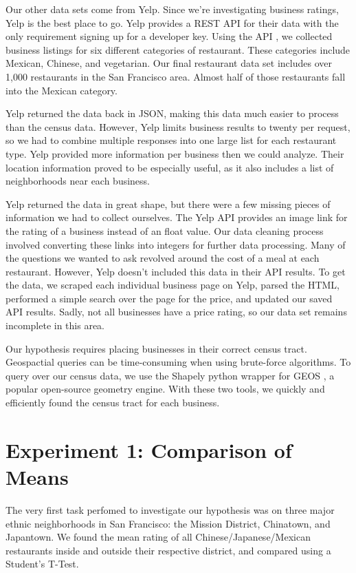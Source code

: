 \documentclass[11pt,twocolumn]{article}
\begin{document}
Our other data sets come from Yelp. Since we're investigating business ratings, Yelp is the best place to go. Yelp provides a REST API for their data with the only requirement signing up for a developer key. Using the API \cite{yelpapi}, we collected business listings for six different categories of restaurant. These categories include Mexican, Chinese, and vegetarian. Our final restaurant data set includes over 1,000 restaurants in the San Francisco area. Almost half of those restaurants fall into the Mexican category.

Yelp returned the data back in JSON, making this data much easier to process than the census data. However, Yelp limits business results to twenty per request, so we had to combine multiple responses into one large list for each restaurant type. Yelp provided more information per business then we could analyze. Their location information proved to be especially useful, as it also includes a list of neighborhoods near each business.

Yelp returned the data in great shape, but there were a few missing pieces of information we had to collect ourselves. The Yelp API provides an image link for the rating of a business instead of an float value. Our data cleaning process involved converting these links into integers for further data processing. Many of the questions we wanted to ask revolved around the cost of a meal at each restaurant. However, Yelp doesn't included this data in their API results. To get the data, we scraped each individual business page on Yelp, parsed the HTML, performed a simple search over the page for the price, and updated our saved API results. Sadly, not all businesses have a price rating, so our data set remains incomplete in this area.

Our hypothesis requires placing businesses in their correct census tract. Geospactial queries can be time-consuming when using brute-force algorithms. To query over our census data, we use the Shapely python wrapper \cite{shapely} for GEOS \cite{geos}, a popular open-source geometry engine. With these two tools, we quickly and efficiently found the census tract for each business.

\section{Experiment 1: Comparison of Means}

The very first task perfomed to investigate our hypothesis was on three major ethnic neighborhoods in San Francisco: the Mission District, Chinatown, and Japantown. We  found the mean rating of all Chinese/Japanese/Mexican restaurants inside and outside their respective district, and compared using a Student's T-Test.
\end{document}

